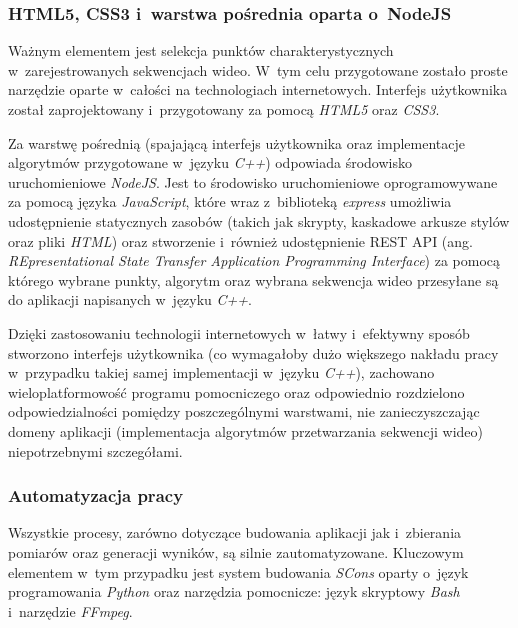       \subsubsection{HTML5, CSS3 i~warstwa pośrednia oparta o~NodeJS}\label{Subsubsection_NodeJS}

        Ważnym elementem jest selekcja punktów charakterystycznych w~zarejestrowanych sekwencjach wideo. W~tym celu przygotowane zostało proste narzędzie oparte w~całości na technologiach internetowych. Interfejs użytkownika został zaprojektowany i~przygotowany za pomocą \textit{HTML5} oraz \textit{CSS3}.

        Za warstwę pośrednią (spajającą interfejs użytkownika oraz implementacje algorytmów przygotowane w~języku \textit{C++}) odpowiada środowisko uruchomieniowe \textit{NodeJS}. Jest to środowisko uruchomieniowe oprogramowywane za pomocą języka \textit{JavaScript}, które wraz z~biblioteką \textit{express} umożliwia udostępnienie statycznych zasobów (takich jak skrypty, kaskadowe arkusze stylów oraz pliki \textit{HTML}) oraz stworzenie i~również udostępnienie REST API (ang. \textit{REpresentational State Transfer Application Programming Interface}) za pomocą którego wybrane punkty, algorytm oraz wybrana sekwencja wideo przesyłane są do aplikacji napisanych w~języku \textit{C++}.

        Dzięki zastosowaniu technologii internetowych w~łatwy i~efektywny sposób stworzono interfejs użytkownika (co wymagałoby dużo większego nakładu pracy w~przypadku takiej samej implementacji w~języku \textit{C++}), zachowano wieloplatformowość programu pomocniczego oraz odpowiednio rozdzielono odpowiedzialności pomiędzy poszczególnymi warstwami, nie zanieczyszczając domeny aplikacji (implementacja algorytmów przetwarzania sekwencji wideo) niepotrzebnymi szczegółami.

      \subsubsection{Automatyzacja pracy}

        Wszystkie procesy, zarówno dotyczące budowania aplikacji jak i~zbierania pomiarów oraz generacji wyników, są silnie zautomatyzowane. Kluczowym elementem w~tym przypadku jest system budowania \textit{SCons} oparty o~język programowania \textit{Python} oraz narzędzia pomocnicze: język skryptowy \textit{Bash} i~narzędzie \textit{FFmpeg}.

